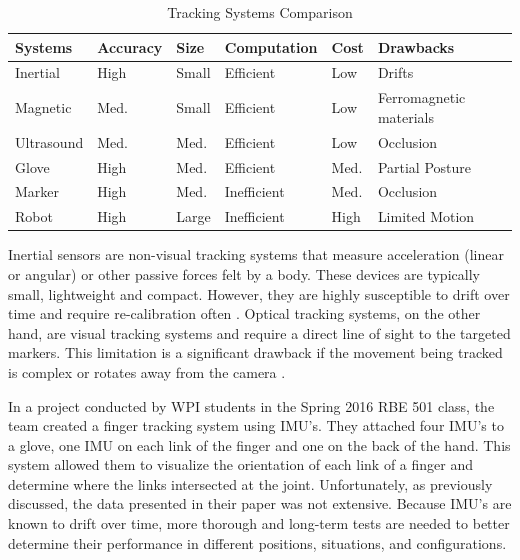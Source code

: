 \documentclass[letterpaper, 10 pt, conference]{ieeeconf}  %
\begin{document}
\begin{table}[h]
	\scriptsize
	\caption{Tracking Systems Comparison}
	\label{table:trackingSystems}
	\begin{center}
    \renewcommand{\arraystretch}{1.5}
	\begin{tabular}{|p{1.0cm}|p{1cm}|p{0.6cm}|p{1.4cm}|p{0.6cm}|p{1.45cm}|}
	\hline
	\textbf{Systems} & \textbf{Accuracy} & \textbf{Size} & \textbf{Computation} & \textbf{Cost} & \textbf{Drawbacks} \\ \hline
	Inertial & High & Small & Efficient & Low & Drifts \\ \hline
    Magnetic & Med. & Small & Efficient & Low & Ferromagnetic materials \\ \hline
    Ultrasound & Med. & Med. & Efficient & Low & Occlusion \\ \hline
    Glove & High & Med. & Efficient & Med. & Partial Posture \\ \hline
    Marker & High & Med. & Inefficient & Med. & Occlusion \\ \hline 
    Robot & High & Large & Inefficient & High & Limited Motion \\ \hline
	\end{tabular}
	\end{center}
\end{table}

Inertial sensors are non-visual tracking systems that measure acceleration (linear or angular) or other passive forces felt by a body. These devices are typically small, lightweight and compact. However, they are highly susceptible to drift over time and require re-calibration often \cite{Zhou}. Optical tracking systems, on the other hand, are visual tracking systems and require a direct line of sight to the targeted markers. This limitation is a significant drawback if the movement being tracked is complex or rotates away from the camera \cite{Zhou}.

In a project conducted by WPI students in the Spring 2016 RBE 501 class, the team created a finger tracking system using IMU’s.  They attached four IMU's to a glove, one IMU on each link of the finger and one on the back of the hand. This system allowed them to visualize the orientation of each link of a finger and determine where the links intersected at the joint.
Unfortunately, as previously discussed, the data presented in their paper was not extensive.  Because IMU’s are known to drift over time, more thorough and long-term tests are needed to better determine their performance in different positions, situations, and configurations.
\end{document}
